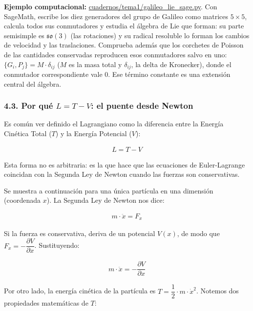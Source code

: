 \documentclass[
  spanish,
]{article}
\begin{document}
\textbf{Ejemplo computacional:}
\href{https://github.com/julian1c2a/MCC/blob/main/cuadernos/tema1/galileo_lie_sage.py}{cuadernos/tema1/galileo\_lie\_sage.py}.
Con SageMath, escribe los diez generadores del grupo de Galileo como
matrices \(5 \times 5\), calcula todos sus conmutadores y estudia el
álgebra de Lie que forman: su parte semisimple es \(\mathfrak{so}(3)\)
(las rotaciones) y su radical resoluble lo forman los cambios de
velocidad y las traslaciones. Comprueba además que los corchetes de
Poisson de las cantidades conservadas reproducen esos conmutadores salvo
en uno: \(\{G_i, P_j\} = M \cdot \delta_{ij}\) (\(M\) es la masa total y
\(\delta_{ij}\), la delta de Kronecker), donde el conmutador
correspondiente vale \(0\). Ese término constante es una extensión
central del álgebra.

\subsubsection{\texorpdfstring{4.3. Por qué \(L = T - V\): el puente
desde
Newton}{4.3. Por qué L = T - V: el puente desde Newton}}\label{por-quuxe9-l-t---v-el-puente-desde-newton}

Es común ver definido el Lagrangiano como la diferencia entre la Energía
Cinética Total (\(T\)) y la Energía Potencial (\(V\)):

\[
\begin{aligned}
L = T - V
\end{aligned}
\]

Esta forma no es arbitraria: es la que hace que las ecuaciones de
Euler-Lagrange coincidan con la Segunda Ley de Newton cuando las fuerzas
son conservativas.

Se muestra a continuación para una única partícula en una dimensión
(coordenada \(x\)). La Segunda Ley de Newton nos dice:

\[
\begin{aligned}
m \cdot \ddot{x} = F_x
\end{aligned}
\]

Si la fuerza es conservativa, deriva de un potencial \(V(x)\), de modo
que \(F_x = -\dfrac{\partial V}{\partial x}\). Sustituyendo:

\[
\begin{aligned}
m \cdot \ddot{x} = -\dfrac{\partial V}{\partial x}
\end{aligned}
\]

Por otro lado, la energía cinética de la partícula es
\(T = \dfrac{1}{2} \cdot m \cdot \dot{x}^2\). Notemos dos propiedades
matemáticas de \(T\):
\end{document}
